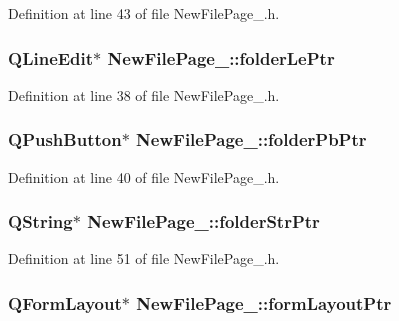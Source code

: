 Definition at line 43 of file New\-File\-Page\-\_.\-h.

\hypertarget{class_new_file_page__4_aa502f56ce180d904bbb70be9409d7ef6}{
\subsubsection[{folder\-Le\-Ptr}]{\setlength{\rightskip}{0pt plus 5cm}Q\-Line\-Edit$\ast$ New\-File\-Page\-\_\-::folder\-Le\-Ptr\hspace{0.3cm}{\ttfamily [private]}}}\label{class_new_file_page__4_aa502f56ce180d904bbb70be9409d7ef6}


Definition at line 38 of file New\-File\-Page\-\_.\-h.

\hypertarget{class_new_file_page__4_ac1b396af8e82371912cbfa03250bd820}{
\subsubsection[{folder\-Pb\-Ptr}]{\setlength{\rightskip}{0pt plus 5cm}Q\-Push\-Button$\ast$ New\-File\-Page\-\_\-::folder\-Pb\-Ptr\hspace{0.3cm}{\ttfamily [private]}}}\label{class_new_file_page__4_ac1b396af8e82371912cbfa03250bd820}


Definition at line 40 of file New\-File\-Page\-\_.\-h.

\hypertarget{class_new_file_page__4_ace9fd5ac4b4aea13c6f6655e521397ec}{
\subsubsection[{folder\-Str\-Ptr}]{\setlength{\rightskip}{0pt plus 5cm}Q\-String$\ast$ New\-File\-Page\-\_\-::folder\-Str\-Ptr\hspace{0.3cm}{\ttfamily [private]}}}\label{class_new_file_page__4_ace9fd5ac4b4aea13c6f6655e521397ec}


Definition at line 51 of file New\-File\-Page\-\_.\-h.

\hypertarget{class_new_file_page__4_a136ab5da5a948efa9b0aad4460f89825}{
\subsubsection[{form\-Layout\-Ptr}]{\setlength{\rightskip}{0pt plus 5cm}Q\-Form\-Layout$\ast$ New\-File\-Page\-\_\-::form\-Layout\-Ptr\hspace{0.3cm}{\ttfamily [private]}}}\label{class_new_file_page__4_a136ab5da5a948efa9b0aad4460f89825}


